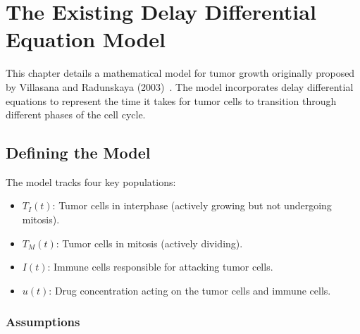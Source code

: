 \chapter{The Existing Delay Differential Equation Model}

This chapter details a mathematical model for tumor growth originally proposed by Villasana and Radunskaya (2003)~\cite{villasana2003}. The model incorporates delay differential equations to represent the time it takes for tumor cells to transition through different phases of the cell cycle.

\section{Defining the Model}

The model tracks four key populations:

\begin{itemize}
    \item $T_I(t)$: Tumor cells in interphase (actively growing but not undergoing mitosis).
    \item $T_M(t)$: Tumor cells in mitosis (actively dividing).
    \item $I(t)$: Immune cells responsible for attacking tumor cells.
    \item $u(t)$: Drug concentration acting on the tumor cells and immune cells.
\end{itemize}

\subsection{Assumptions}



